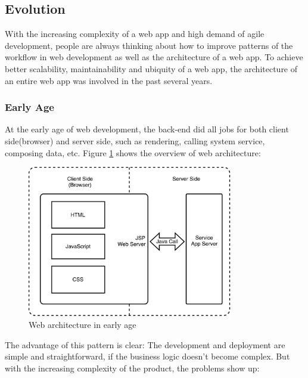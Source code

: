 

\subsection{Evolution}
With the increasing complexity of a web app and high demand of agile development, people are always thinking about how to improve patterns of the workflow in web development as well as the architecture of a web app. To achieve better scalability, maintainability and ubiquity of a web app, the architecture of an entire web app was involved in the past several years.

\subsubsection{Early Age}
At the early age of web development, the back-end did all jobs for both client side(browser) and server side, such as rendering, calling system service, composing data, etc. Figure \ref{fig:3.1} shows the overview of web architecture:
\begin{figure}[!htbp]
  \centering
    \includegraphics[width=0.8\textwidth]{Figures/tech-web-arch-early.pdf}
  \caption{Web architecture in early age}
  \label{fig:3.1}
\end{figure}
The advantage of this pattern is clear: The development and deployment are simple and straightforward, if the business logic doesn't become complex. But with the increasing complexity of the product, the problems show up:
